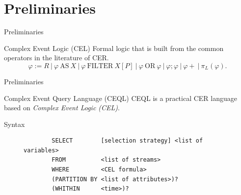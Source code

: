 \documentclass[xcolor=pdftex,dvipsnames,table]{beamer}
\begin{document}

\section{Preliminaries}



\begin{frame}{Preliminaries}
  \begin{block}{Complex Event Logic (CEL)}
    Formal logic that is built from the common operators in the literature of CER.
    \begin{equation*}
      \varphi := R    \ | \ \varphi \ \text{AS} \ X    \ | \    \varphi \ \text{FILTER} \ X[P]  \ | \   \varphi \ \text{OR} \ \varphi   \ | \  \varphi ; \varphi    \ | \  \varphi+ \ | \ \pi_{L}(\varphi).
    \end{equation*}
  \end{block}
\end{frame}


\begin{frame}[fragile]{Preliminaries}
  \begin{block}{Complex Event Query Language (CEQL)}
    CEQL is a practical CER language based on \emph{Complex Event Logic (CEL)}.
  \end{block}
  \begin{block}{Syntax}
    \begin{figure}[H]
      \begin{verbatim}
        SELECT        [selection strategy] <list of variables>
        FROM          <list of streams>
        WHERE         <CEL formula>
        (PARTITION BY <list of attributes>)?
        (WHITHIN      <time>)?
      \end{verbatim}
    \end{figure}
  \end{block}
\end{frame}
\end{document}
